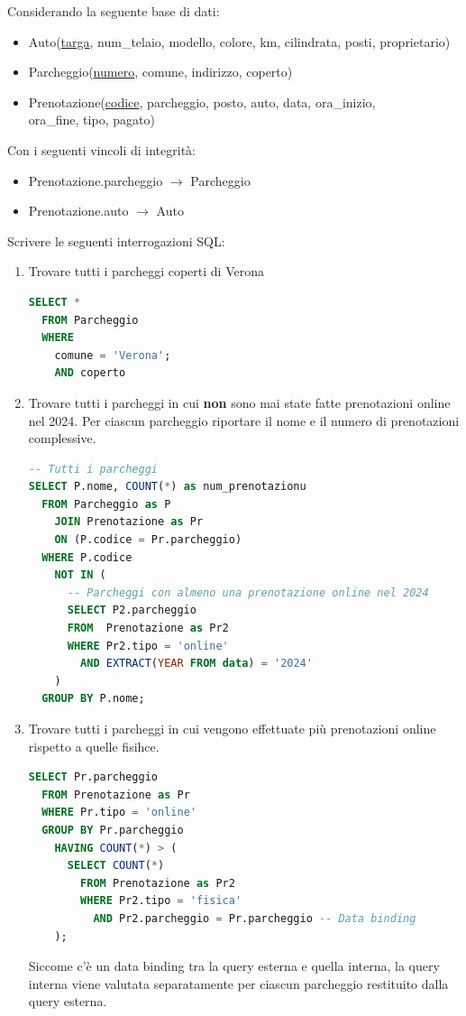\documentclass[a4paper]{article}
\begin{document}
\begin{exercise}
  \label{exercise:parcheggi}
  Considerando la seguente base di dati:
  \begin{itemize}
    \item Auto(\underline{targa}, num\_telaio, modello, colore, km, cilindrata, posti,
      proprietario)

    \item Parcheggio(\underline{numero}, comune, indirizzo, coperto)

    \item Prenotazione(\underline{codice}, parcheggio, posto, auto, data, ora\_inizio,\\
      ora\_fine, tipo, pagato)
  \end{itemize}
  \noindent
  Con i seguenti vincoli di integrità:
  \begin{itemize}
    \item Prenotazione.parcheggio $\to$ Parcheggio
    \item Prenotazione.auto $\to$ Auto
  \end{itemize}
  \noindent
  Scrivere le seguenti interrogazioni SQL:
  \begin{enumerate}
    \item Trovare tutti i parcheggi coperti di Verona
\begin{lstlisting}[language=SQL]
SELECT *
  FROM Parcheggio
  WHERE 
    comune = 'Verona';
    AND coperto
\end{lstlisting}

    \item Trovare tutti i parcheggi in cui \textbf{non} sono mai state fatte
      prenotazioni online nel 2024. Per ciascun parcheggio riportare il nome
      e il numero di prenotazioni complessive.
\begin{lstlisting}[language=SQL]
-- Tutti i parcheggi
SELECT P.nome, COUNT(*) as num_prenotazionu
  FROM Parcheggio as P
    JOIN Prenotazione as Pr
    ON (P.codice = Pr.parcheggio)
  WHERE P.codice
    NOT IN (
      -- Parcheggi con almeno una prenotazione online nel 2024
      SELECT P2.parcheggio
      FROM  Prenotazione as Pr2
      WHERE Pr2.tipo = 'online'
        AND EXTRACT(YEAR FROM data) = '2024'
    )
  GROUP BY P.nome;
\end{lstlisting}

    \item Trovare tutti i parcheggi in cui vengono effettuate più prenotazioni online
      rispetto a quelle fisihce.
\begin{lstlisting}[language=SQL]
SELECT Pr.parcheggio
  FROM Prenotazione as Pr
  WHERE Pr.tipo = 'online'
  GROUP BY Pr.parcheggio
    HAVING COUNT(*) > (
      SELECT COUNT(*)
        FROM Prenotazione as Pr2
        WHERE Pr2.tipo = 'fisica'
          AND Pr2.parcheggio = Pr.parcheggio -- Data binding
    );
\end{lstlisting}
    Siccome c'è un data binding tra la query esterna e quella interna, la query interna
    viene valutata separatamente per ciascun parcheggio restituito dalla query esterna.

  \end{enumerate}
\end{exercise}
\end{document}
